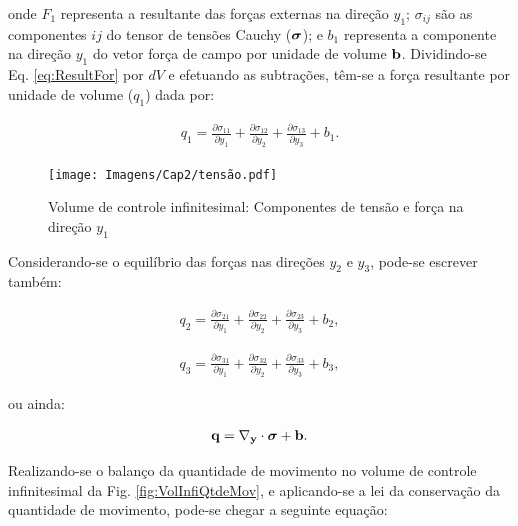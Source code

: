 \documentclass[tese_patricia]{subfiles}%
\begin{document}
\noindent onde $F_1$ representa a resultante das forças externas na direção $y_1$; $\sigma_{ij}$ são as componentes $ij$ do tensor de tensões Cauchy ($\bm{\sigma}$); e $b_1$ representa a componente na direção $y_1$ do vetor força de campo por unidade de volume $\mathbf{b}$. Dividindo-se Eq. \ref{eq:ResultFor} por $dV$ e efetuando as subtrações, têm-se a força resultante por unidade de volume ($q_1$) dada por:

\begin{align}
		q_1 =\frac{\partial \sigma_{11}}{\partial y_1} + \frac{\partial \sigma_{12}}{\partial y_2} + \frac{\partial \sigma_{13}}{\partial y_3} + b_{1}.\label{eq:ForçasIntx1} 
\end{align}	

\begin{figure}[htb!]
	\centering 
	\texttt{[image: Imagens/Cap2/tensão.pdf]}	
	\caption{Volume de controle infinitesimal: Componentes de tensão e força na direção $y_1$}
	\label{fig:VolInfiFor}
\end{figure}

Considerando-se o equilíbrio das forças nas direções $y_2$ e $y_3$, pode-se escrever também:

\begin{align}
	q_2 =\frac{\partial \sigma_{21}}{\partial y_1} + \frac{\partial \sigma_{22}}{\partial y_2} + \frac{\partial \sigma_{23}}{\partial y_3} + b_{2}\label{eq:ForçasIntx2},
\end{align}	

\begin{align}
	q_3 =\frac{\partial \sigma_{31}}{\partial y_1} + \frac{\partial \sigma_{32}}{\partial y_2} + \frac{\partial \sigma_{33}}{\partial y_3} + b_{3}\label{eq:ForçasIntx3},
\end{align}

\noindent ou ainda:

\begin{align}
	\mathbf{q} = \mathbf{\nabla_y} \cdot \bm{\sigma} + \mathbf{b}.
\end{align}


Realizando-se o balanço da quantidade de movimento no volume de controle infinitesimal da Fig. \ref{fig:VolInfiQtdeMov}, e aplicando-se a lei da conservação da quantidade de movimento, pode-se chegar a seguinte equação:
\end{document}
